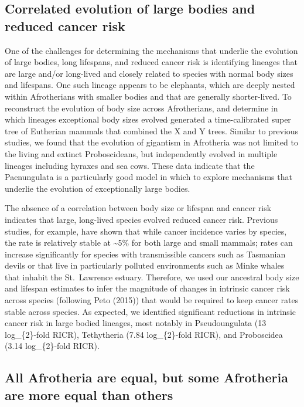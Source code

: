 \documentclass[]{elsarticle} %
\begin{document}
\hypertarget{correlated-evolution-of-large-bodies-and-reduced-cancer-risk}{%
\subsection{Correlated evolution of large bodies and reduced cancer risk}\label{correlated-evolution-of-large-bodies-and-reduced-cancer-risk}}

One of the challenges for determining the mechanisms that underlie the evolution of large bodies, long lifespans, and reduced cancer risk is identifying lineages that are large and/or long-lived and closely related to species with normal body sizes and lifespans. One such lineage appears to be elephants, which are deeply nested within Afrotherians with smaller bodies and that are generally shorter-lived. To reconstruct the evolution of body size across Afrotherians, and determine in which lineages exceptional body sizes evolved generated a time-calibrated super tree of Eutherian mammals that combined the X and Y trees. Similar to previous studies, we found that the evolution of gigantism in Afrotheria was not limited to the living and extinct Proboscideans, but independently evolved in multiple lineages including hyraxes and sea cows. These data indicate that the Paenungulata is a particularly good model in which to explore mechanisms that underlie the evolution of exceptionally large bodies.

The absence of a correlation between body size or lifespan and cancer risk indicates that large, long-lived species evolved reduced cancer risk. Previous studies, for example, have shown that while cancer incidence varies by species, the rate is relatively stable at \textasciitilde5\% for both large and small mammals; rates can increase significantly for species with transmissible cancers such as Tasmanian devils or that live in particularly polluted environments such as Minke whales that inhabit the St.~Lawrence estuary. Therefore, we used our ancestral body size and lifespan estimates to infer the magnitude of changes in intrinsic cancer risk across species (following Peto (2015)) that would be required to keep cancer rates stable across species. As expected, we identified significant reductions in intrinsic cancer risk in large bodied lineages, most notably in Pseudoungulata (13 log\_\{2\}-fold RICR), Tethytheria (7.84 log\_\{2\}-fold RICR), and Proboscidea (3.14 log\_\{2\}-fold RICR).

\hypertarget{all-afrotheria-are-equal-but-some-afrotheria-are-more-equal-than-others}{%
\subsection{All Afrotheria are equal, but some Afrotheria are more equal than others}\label{all-afrotheria-are-equal-but-some-afrotheria-are-more-equal-than-others}}
\end{document}
